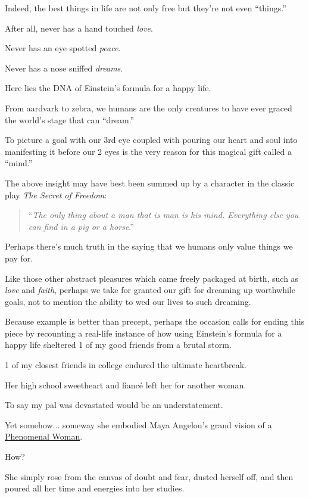 \documentclass{book}
\numberwithin{equation}{section}
\begin{document}
%
Indeed, the best things in life are not only free but they're not even ``things.''

After all, never has a hand touched \textit{love}.

Never has an eye spotted \textit{peace}.

Never has a nose sniffed \textit{dreams}.

Here lies the DNA of Einstein's formula for a happy life.

%
From aardvark to zebra, we humans are the only creatures to have ever graced the world's stage that can ``dream.''

To picture a goal with our 3rd eye coupled with pouring our heart and soul into manifesting it before our 2 eyes is the very reason for this magical gift called a ``mind.''

%
The above insight may have best been summed up by a character in the classic play \textit{The Secret of Freedom}:

\begin{quotation}
    ``\textit{The only thing about a man that is man is his mind. Everything else you can find in a pig or a horse}.''
\end{quotation}
Perhaps there's much truth in the saying that we humans only value things we pay for.

%
Like those other abstract pleasures which came freely packaged at birth, such as \textit{love} and \textit{faith}, perhaps we take for granted our gift for dreaming up worthwhile goals, not to mention the ability to wed our lives to such dreaming.

%
Because example is better than precept, perhaps the occasion calls for ending this piece by recounting a real-life instance of how using Einstein's formula for a happy life sheltered 1 of my good friends from a brutal storm.

%
1 of my closest friends in college endured the ultimate heartbreak.

Her high school sweetheart and fiancé left her for another woman.

To say my pal was devastated would be an understatement.

Yet somehow$\ldots$ someway she embodied Maya Angelou's grand vision of a \href{https://www.poetryfoundation.org/poems/48985/phenomenal-woman}{Phenomenal Woman}.

%
How?

%
She simply rose from the canvas of doubt and fear, dusted herself off, and then poured all her time and energies into her studies.
\end{document}
